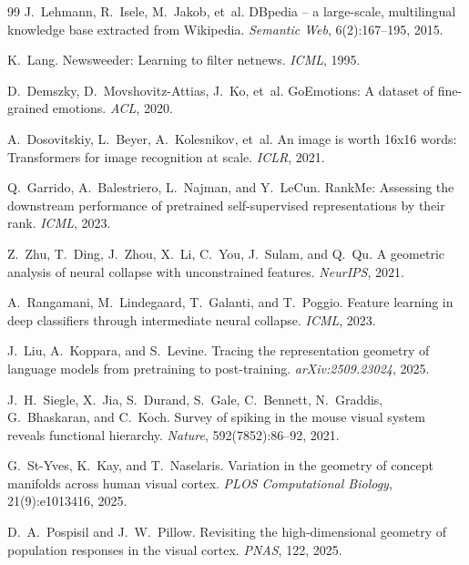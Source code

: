 \documentclass{article}
\begin{document}
\begin{thebibliography}{99}
J.~Lehmann, R.~Isele, M.~Jakob, et~al.
\newblock DBpedia -- a large-scale, multilingual knowledge base extracted from Wikipedia.
\newblock \emph{Semantic Web}, 6(2):167--195, 2015.

K.~Lang.
\newblock Newsweeder: Learning to filter netnews.
\newblock \emph{ICML}, 1995.

D.~Demszky, D.~Movshovitz-Attias, J.~Ko, et~al.
\newblock GoEmotions: A dataset of fine-grained emotions.
\newblock \emph{ACL}, 2020.

A.~Dosovitskiy, L.~Beyer, A.~Kolesnikov, et~al.
\newblock An image is worth 16x16 words: Transformers for image recognition at scale.
\newblock \emph{ICLR}, 2021.

Q.~Garrido, A.~Balestriero, L.~Najman, and Y.~LeCun.
\newblock RankMe: Assessing the downstream performance of pretrained self-supervised representations by their rank.
\newblock \emph{ICML}, 2023.

Z.~Zhu, T.~Ding, J.~Zhou, X.~Li, C.~You, J.~Sulam, and Q.~Qu.
\newblock A geometric analysis of neural collapse with unconstrained features.
\newblock \emph{NeurIPS}, 2021.

A.~Rangamani, M.~Lindegaard, T.~Galanti, and T.~Poggio.
\newblock Feature learning in deep classifiers through intermediate neural collapse.
\newblock \emph{ICML}, 2023.

J.~Liu, A.~Koppara, and S.~Levine.
\newblock Tracing the representation geometry of language models from pretraining to post-training.
\newblock \emph{arXiv:2509.23024}, 2025.

J.~H.~Siegle, X.~Jia, S.~Durand, S.~Gale, C.~Bennett, N.~Graddis, G.~Bhaskaran, and C.~Koch.
\newblock Survey of spiking in the mouse visual system reveals functional hierarchy.
\newblock \emph{Nature}, 592(7852):86--92, 2021.

G.~St-Yves, K.~Kay, and T.~Naselaris.
\newblock Variation in the geometry of concept manifolds across human visual cortex.
\newblock \emph{PLOS Computational Biology}, 21(9):e1013416, 2025.

D.~A.~Pospisil and J.~W.~Pillow.
\newblock Revisiting the high-dimensional geometry of population responses in the visual cortex.
\newblock \emph{PNAS}, 122, 2025.


\end{thebibliography}
\end{document}
